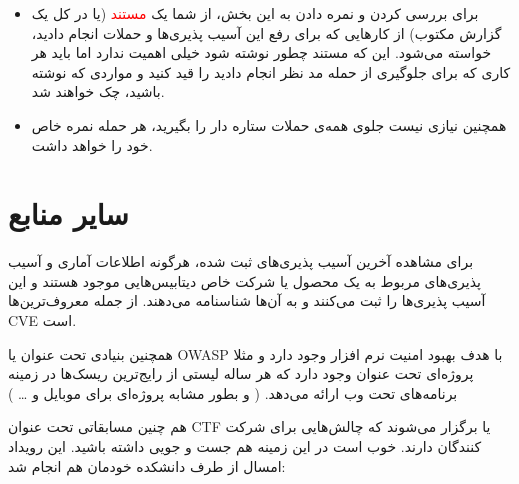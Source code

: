 \documentclass[]{article}
\begin{document}
\begin{itemize}
\item
برای بررسی کردن و نمره دادن به این بخش، از شما یک \textcolor{red}{مستند} (یا در کل یک گزارش مکتوب) از کارهایی که برای رفع این آسیب پذیری‌ها و حملات انجام دادید، خواسته می‌‌شود. این که مستند چطور نوشته شود خیلی اهمیت ندارد اما باید هر کاری که برای جلوگیری از حمله مد نظر انجام دادید را قید کنید و مواردی که نوشته باشید، چک خواهند شد.
\item
همچنین نیازی نیست جلوی همه‌ی حملات ستاره دار را بگیرید‌،‌ هر حمله نمره خاص خود را خواهد داشت.
\end{itemize}


\section*{{\titr سایر منابع}}

برای مشاهده آخرین آسیب پذیری‌های ثبت شده، هرگونه اطلاعات آماری و آسیب پذیری‌های مربوط به یک محصول یا شرکت خاص دیتابیس‌هایی موجود هستند و این آسیب پذیری‌ها را ثبت می‌کنند و به آن‌ها شناسنامه می‌دهند. از جمله معروف‌ترین‌ها CVE است.

\begin{flushleft}
\href{https://www.cvedetails.com}{\textcolor{blue}{\underline{}}}
\end{flushleft}
\bigskip

همچنین بنیادی تحت عنوان   یا OWASP با هدف بهبود امنیت نرم افزار وجود دارد و مثلا پروژه‌ای تحت عنوان  وجود دارد که هر ساله لیستی از رایج‌ترین ریسک‌ها در زمینه برنامه‌های تحت وب ارائه می‌دهد. ( و بطور مشابه پروژه‌ای برای موبایل و … )

\begin{flushleft}
\href{https://owasp.org/www-project-top-ten}{\textcolor{blue}{\underline{}}}
\end{flushleft}

\bigskip
هم چنین مسابقاتی تحت عنوان CTF یا   برگزار می‌شوند که چالش‌هایی برای شرکت کنندگان دارند. خوب است در این زمینه هم جست و جویی داشته باشید. این رویداد امسال از طرف دانشکده خودمان هم انجام شد:

\begin{flushleft}
\href{https://susec.tf}{\textcolor{blue}{\underline{}}}
\end{flushleft}





\newpage
\end{document}

